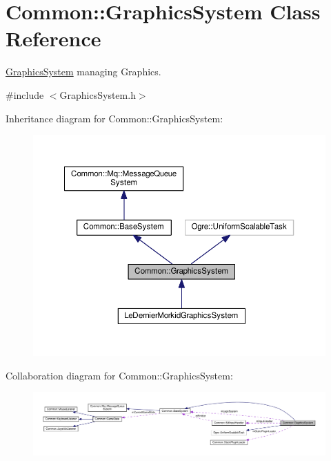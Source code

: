 \hypertarget{class_common_1_1_graphics_system}{}\section{Common\+:\+:Graphics\+System Class Reference}
\label{class_common_1_1_graphics_system}


\hyperlink{class_common_1_1_graphics_system}{Graphics\+System} managing Graphics.  




{\ttfamily \#include $<$Graphics\+System.\+h$>$}



Inheritance diagram for Common\+:\+:Graphics\+System\+:\nopagebreak
\begin{figure}[H]
\begin{center}
\leavevmode
\includegraphics[width=350pt]{class_common_1_1_graphics_system__inherit__graph}
\end{center}
\end{figure}


Collaboration diagram for Common\+:\+:Graphics\+System\+:\nopagebreak
\begin{figure}[H]
\begin{center}
\leavevmode
\includegraphics[width=350pt]{class_common_1_1_graphics_system__coll__graph}
\end{center}
\end{figure}

